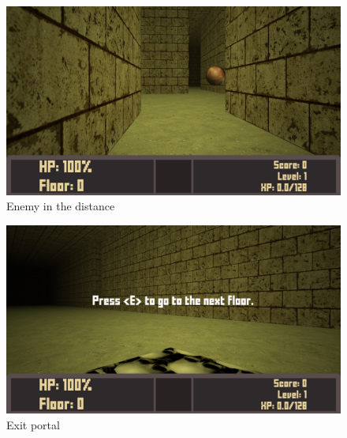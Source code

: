 \documentclass[11pt]{article}
\begin{document}
\begin{figure}[htbp]
\centering
\includegraphics[width=.9\linewidth]{./enemy.png}
\caption{Enemy in the distance}
\end{figure}

\begin{figure}[htbp]
\centering
\includegraphics[width=.9\linewidth]{./portal.png}
\caption{Exit portal}
\end{figure}
\end{document}
